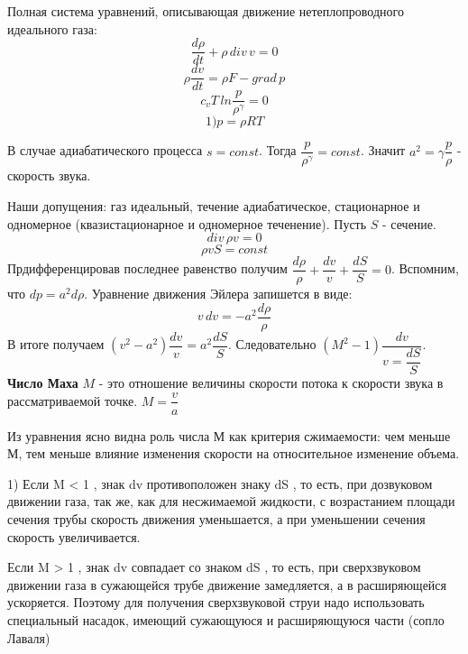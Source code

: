 Полная система уравнений, описывающая движение нетеплопроводного идеального газа:
$$\dfrac{d \rho}{d t} + \rho \,div\, v = 0 $$
$$  \rho \dfrac{d v}{d t} = \rho F - grad \,p $$
$$c_v T\, ln\dfrac{p}{\rho^\gamma} = 0$$
$$1) p = \rho R T$$

В случае адиабатического процесса $s = const$. Тогда $\dfrac{p}{\rho^\gamma} = const $. Значит $a^2 = \gamma \dfrac{p}{\rho}$ - скорость звука.

Наши допущения: газ идеальный, течение адиабатическое, стационарное и одномерное (квазистационарное и одномерное теченение). Пусть $S$ - сечение.
$$div\, \rho v = 0$$
$$\rho v S = const$$
Прдифференцировав последнее равенство получим $\dfrac{d \rho}{\rho} + \dfrac{d v}{v} + \dfrac{d S}{S} = 0$.
Вспомним, что $dp = a^2 d\rho$.
Уравнение движения Эйлера запишется в виде:$$v\, dv = -a^2 \dfrac{d \rho}{\rho}$$
В итоге получаем $(v^2 - a^2)\dfrac{d v}{v} = a^2 \dfrac{dS}{S}$. Следовательно $(M^2 - 1)\dfrac{d v}{v = \dfrac{d S}{S}}$.
\textbf{Число Маха} $M$ - это отношение величины скорости потока к скорости звука в рассматриваемой точке. $M = \dfrac{v}{a}$

Из уравнения ясно видна роль числа М как критерия сжимаемости: чем меньше М, тем меньше влияние изменения скорости  на относительное изменение объема.

1) Если M < 1 , знак dv противоположен знаку dS , то есть, при дозвуковом движении газа, так же, как для несжимаемой жидкости, с возрастанием площади сечения трубы скорость движения уменьшается, а при уменьшении сечения скорость увеличивается.

Если M > 1 , знак dv совпадает со знаком dS , то есть, при сверхзвуковом движении газа в сужающейся трубе движение замедляется, а в расширяющейся ускоряется. Поэтому для получения сверхзвуковой струи надо использовать специальный насадок, имеющий сужающуюся и расширяющуюся части (сопло Лаваля)

